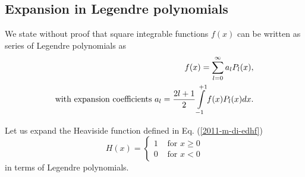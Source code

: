 \subsection{Expansion in Legendre polynomials}

We state without proof  that square integrable functions $f(x)$
can be written as series of Legendre polynomials
as
\begin{equation}
\begin{split}
 f(x)=\sum_{l=0}^\infty a_lP_l(x),\\
\textrm{with expansion coefficients } a_l={2l+1\over 2}
\int\limits_{-1}^{+1}f(x)P_l(x)dx.
 \end{split}
\end{equation}

{
\color{blue}
\bexample
Let us expand the Heaviside function defined in Eq. (\ref{2011-m-di-edhf})
\begin{equation}
H(x)
=
\left\{
\begin{array}{rl}
1&\textrm{ for } x\ge  0\\
0&\textrm{ for } x <  0
\end{array}
\right.
\end{equation}
in terms of Legendre polynomials.

}

